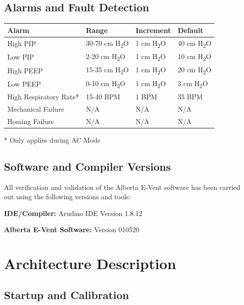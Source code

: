 \documentclass[]{article}
\begin{document}
\subsection{Alarms and Fault Detection}
\begin{center}
	\begin{tabular}{ |p{3.8cm}| p{2.2cm}| p{2.2cm}|p{2.2cm}|}
		\hline
		\textbf{Alarm} & \textbf{Range} & \textbf{Increment} & \textbf{Default}\\
		\hline
		High PIP & 30-70 cm H\textsubscript{2}O & 1 cm H\textsubscript{2}O & 40 cm H\textsubscript{2}O\\
		\hline
		Low PIP & 2-20 cm H\textsubscript{2}O & 1 cm H\textsubscript{2}O & 10 cm H\textsubscript{2}O\\
		\hline
		High PEEP & 15-35 cm H\textsubscript{2}O & 1 cm H\textsubscript{2}O &  20 cm H\textsubscript{2}O\\
		\hline
		Low PEEP & 0-10 cm H\textsubscript{2}O & 1 cm H\textsubscript{2}O &  3 cm H\textsubscript{2}O\\
		\hline
		High Respiratory Rate* & 15-40 BPM & 1 BPM & 35 BPM\\
		\hline
		Mechanical Failure & N/A & N/A & N/A\\
		\hline
		Homing Failure & N/A & N/A & N/A \\
		\hline
	\end{tabular}
	
\end{center}
* Only applies during AC Mode


\subsection{Software and Compiler Versions}

All verification and validation of the Alberta E-Vent software has been carried out using the following versions and tools:

\noindent\textbf{IDE/Compiler:} Arudino IDE Version 1.8.12

\noindent\textbf{Alberta E-Vent Software:} Version 010520




\clearpage
\section{Architecture Description}
\label{sect:architecture}



\subsection{Startup and Calibration}
\label{sect:startup_and_cal}
\end{document}
